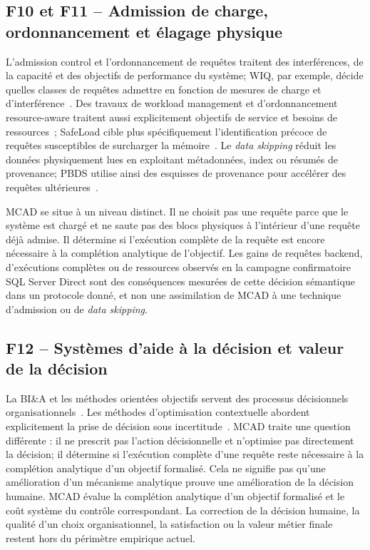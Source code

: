 \documentclass[journal]{IEEEtran}
\begin{document}
\subsection{F10 et F11 -- Admission de charge, ordonnancement et élagage physique}

L'admission control et l'ordonnancement de requêtes traitent des interférences, de la capacité et des objectifs de performance du système; WIQ, par exemple, décide quelles classes de requêtes admettre en fonction de mesures de charge et d'interférence~\cite{KraftWIQ2012}. Des travaux de workload management et d'ordonnancement resource-aware traitent aussi explicitement objectifs de service et besoins de ressources~\cite{KrompassDayalKunoKemper2007,PowleyMartinGruskaBirdKalmuk2014}; SafeLoad cible plus spécifiquement l'identification précoce de requêtes susceptibles de surcharger la mémoire~\cite{SafeLoad2025}. Le \emph{data skipping} réduit les données physiquement lues en exploitant métadonnées, index ou résumés de provenance; PBDS utilise ainsi des esquisses de provenance pour accélérer des requêtes ultérieures~\cite{NiuDataSkipping2021}.

MCAD se situe à un niveau distinct. Il ne choisit pas une requête parce que le système est chargé et ne saute pas des blocs physiques à l'intérieur d'une requête déjà admise. Il détermine si l'exécution complète de la requête est encore nécessaire à la complétion analytique de l'objectif. Les gains de requêtes backend, d'exécutions complètes ou de ressources observés en la campagne confirmatoire SQL Server Direct sont des conséquences mesurées de cette décision sémantique dans un protocole donné, et non une assimilation de MCAD à une technique d'admission ou de \emph{data skipping}.

\subsection{F12 -- Systèmes d'aide à la décision et valeur de la décision}

La BI\&A et les méthodes orientées objectifs servent des processus décisionnels organisationnels~\cite{ChenBI2012,Pourshahid2014}. Les méthodes d'optimisation contextuelle abordent explicitement la prise de décision sous incertitude~\cite{SadanaEJOR2025}. MCAD traite une question différente : il ne prescrit pas l'action décisionnelle et n'optimise pas directement la décision; il détermine si l'exécution complète d'une requête reste nécessaire à la complétion analytique d'un objectif formalisé. Cela ne signifie pas qu'une amélioration d'un mécanisme analytique prouve une amélioration de la décision humaine. MCAD évalue la complétion analytique d'un objectif formalisé et le coût système du contrôle correspondant. La correction de la décision humaine, la qualité d'un choix organisationnel, la satisfaction ou la valeur métier finale restent hors du périmètre empirique actuel.
\end{document}
